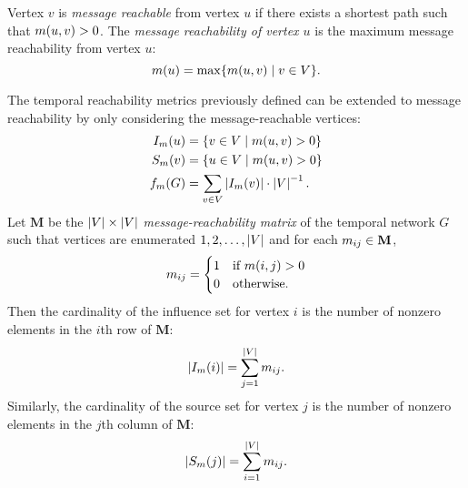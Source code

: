 Vertex $v$ is \emph{message reachable} from vertex $u$ if there exists a shortest path such that $m(u, v) > 0$. The \emph{message reachability of vertex $u$} is the maximum message reachability from vertex $u$:
%
\begin{equation}\label{eq:vreach}
	m(u) = \max \{m(u, v) \mid v \in V\}.
\end{equation}

The temporal reachability metrics previously defined can be extended to message reachability by only considering the message-reachable vertices:
%
\begin{align*}
	I_m(u) &= \{v \in V \mid m(u, v) > 0\} \\
	S_m(v) &= \{u \in V \mid m(u, v) > 0\} \\
	f_m(G) &= \sum_{v \in V} \left\vert I_m(v) \right\vert \cdot \left\vert V \right\vert^{-1}.
\end{align*}
%
Let $\mathbf{M}$ be the $\left\vert V \right\vert \times \left\vert V \right\vert$ \emph{message-reachability matrix} of the temporal network $G$ such that vertices are enumerated $1, 2, \ldots, \left\vert V \right\vert$ and for each $m_{ij} \in \mathbf{M}$,
%
\begin{equation*}
	m_{ij} = 
	   \begin{cases}
        	1 & \text{if } m(i, j) > 0 \\
        	0 & \text{otherwise.}
	   \end{cases}
\end{equation*}
%
Then the cardinality of the influence set for vertex $i$ is the number of nonzero elements in the $i$th row of $\mathbf{M}$:
%
\begin{equation}\label{eq:influence-size}
	\left\vert I_m(i) \right\vert = \sum_{j=1}^{\left\vert V \right\vert} m_{ij} .
\end{equation}
%
Similarly, the cardinality of the source set for vertex $j$ is the number of nonzero elements in the $j$th column of $\mathbf{M}$:
%
\begin{equation}\label{eq:source-size}
	\left\vert S_m(j) \right\vert = \sum_{i=1}^{\left\vert V \right\vert} m_{ij} .
\end{equation}

